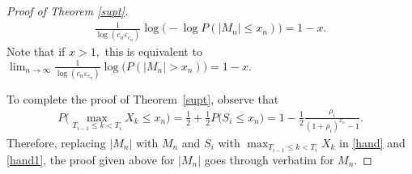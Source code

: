 \documentclass[12pt]{amsart}
\begin{document}
\begin{proof}[Proof of Theorem \ref{supt}]
\begin{eqnarray*}
\frac{1}{\log(c_n {\varepsilon}_{c_{n}})} \log\bigl(-\log P(|M_n| \leq
x_n)\bigr)=1-x. \end{eqnarray*} Note that if $x>1,$ this is equivalent to $
\lim_{n\to\infty} \frac{1}{\log(c_n {\varepsilon}_{c_{n}})}
\log\bigl(P(|M_n| >x_n)\bigr)=1-x.$
\par
To complete the proof of Theorem~\ref{supt}, observe that \begin{eqnarray*}
P\bigl(\max_{T_{i-1} \le k < T_{i}} X_k \leq x_n\bigr
)={\frac {\displaystyle {1}}{\displaystyle {2} }}+{\frac {\displaystyle {1}}{\displaystyle {2} }}P\bigl(S_i\leq x_n\bigr )=1-{\frac {\displaystyle {1}}{\displaystyle {2} }}
{\frac {\displaystyle {\rho_i}}{\displaystyle {(1+\rho_i)^{x_n}-1} }}.\end{eqnarray*} Therefore, replacing $|M_n|$
with $M_n$ and $S_i$ with $\max_{T_{i-1} \le k < T_{i}} X_k$ in
\eqref{hand} and \eqref{hand1}, the proof given above for $|M_n|$
goes through verbatim for $M_n.$
\end{proof}
\end{document}
